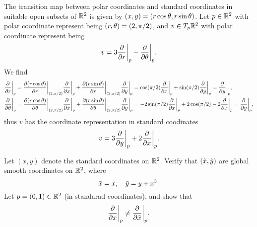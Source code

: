 \begin{example} 
    The transition map between polar coordinates and standard coordinates in suitable open subsets of $\mathbb{R}^2$ is given by $(x,y) = (r\cos \theta, r\sin \theta)$. Let $p \in \mathbb{R}^2$ with polar coordinate represent being $(r,\theta) = (2, \pi/2)$, and $v \in T_p\mathbb{R}^2$ with polar coordinate represent being
    $$ v = 3 \pdv{}{r}\bigg|_{p}-\pdv{}{\theta}\bigg|_{p}. $$ 
    We find
    \begin{align*}
    &\pdv{}{r}\bigg|_{p} = \pdv{(r\cos \theta)}{r}\bigg|_{(2,\pi/2)} \pdv{}{x}\bigg|_{p} + 
                    \pdv{(r\sin \theta)}{r}\bigg|_{(2,\pi/2)} \pdv{}{y}\bigg|_{p}
                  = \cos(\pi/2) \pdv{}{x}\bigg|_{p} + \sin(\pi/2) \pdv{}{y}\bigg|_{p} 
                  = \pdv{}{y}\bigg|_{p}, \\
    &\pdv{}{\theta}\bigg|_{p} = \pdv{(r\cos \theta)}{\theta}\bigg|_{(2,\pi/2)} \pdv{}{x}\bigg|_{p} + 
                    \pdv{(r\sin \theta)}{\theta}\bigg|_{(2,\pi/2)} \pdv{}{y}\bigg|_{p}
                  = -2\sin(\pi/2) \pdv{}{x}\bigg|_{p} + 2\cos(\pi/2) -2\pdv{}{x}\bigg|_{p} 
                  = \pdv{}{y}\bigg|_{p},               
    \end{align*}
    thus $v$ has the coordinate representation in standard coodinates
    $$v = 3\pdv{}{y}\bigg|_{p} + 2 \pdv{}{x}\bigg|_{p}. $$
\end{example}
\begin{exercise}
    Let $(x,y)$ denote the standard coordinates on $\mathbb{R}^2$. Verify that $(\Tilde{x},\Tilde{y})$ are global smooth coordinates on $\mathbb{R}^2$, where 
    $$\Tilde{x} = x, \quad \Tilde{y} = y+x^3. $$
    Let $p = (0,1) \in \mathbb{R}^2$ (in standarad coordinates), and show that 
    $$ \pdv{}{x}\bigg|_{p} \neq  \pdv{}{\Tilde{x}}\bigg|_{p}. $$
\end{exercise}

